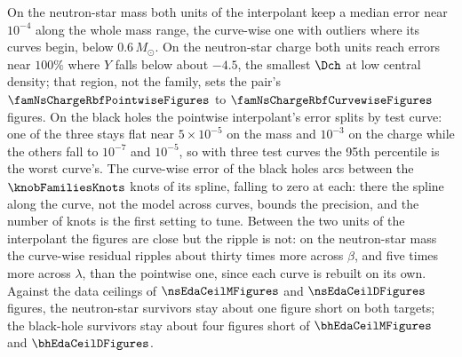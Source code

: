 On the neutron-star mass both units of the interpolant keep a median error near $10^{-4}$ along the whole mass range, the curve-wise one with outliers where its curves begin, below $0.6\,M_\odot$. On the neutron-star charge both units reach errors near $100\%$ where $Y$ falls below about $-4.5$, the smallest $\Dch$ at low central density; that region, not the family, sets the pair's $\famNsChargeRbfPointwiseFigures$ to $\famNsChargeRbfCurvewiseFigures$ figures. On the black holes the pointwise interpolant's error splits by test curve: one of the three stays flat near $5 \times 10^{-5}$ on the mass and $10^{-3}$ on the charge while the others fall to $10^{-7}$ and $10^{-5}$, so with three test curves the 95th percentile is the worst curve's. The curve-wise error of the black holes arcs between the $\knobFamiliesKnots$ knots of its spline, falling to zero at each: there the spline along the curve, not the model across curves, bounds the precision, and the number of knots is the first setting to tune. Between the two units of the interpolant the figures are close but the ripple is not: on the neutron-star mass the curve-wise residual ripples about thirty times more across $\beta$, and five times more across $\lambda$, than the pointwise one, since each curve is rebuilt on its own. Against the data ceilings of $\nsEdaCeilMFigures$ and $\nsEdaCeilDFigures$ figures, the neutron-star survivors stay about one figure short on both targets; the black-hole survivors stay about four figures short of $\bhEdaCeilMFigures$ and $\bhEdaCeilDFigures$.
\FloatBarrier

